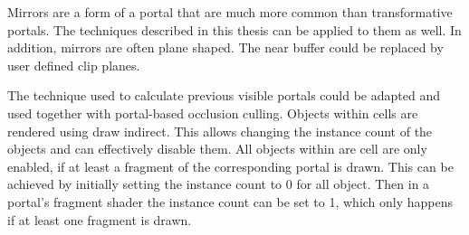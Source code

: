 Mirrors are a form of a portal that are much more common than transformative portals. The techniques described in this thesis can be applied to them as well. In addition, mirrors are often plane shaped. The near buffer could be replaced by user defined clip planes.


The technique used to calculate previous visible portals could be adapted and used together with portal-based occlusion culling. Objects within cells are rendered using draw indirect. This allows changing the instance count of the objects and can effectively disable them. All objects within are cell are only enabled, if at least a fragment of the corresponding portal is drawn. This can be achieved by initially setting the instance count to 0 for all object. Then in a portal's fragment shader the instance count can be set to 1, which only happens if at least one fragment is drawn.






